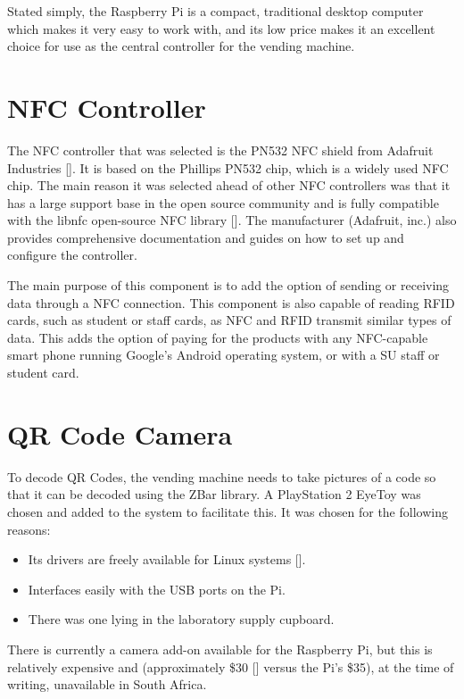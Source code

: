 Stated simply, the Raspberry Pi is a compact, traditional desktop computer which makes it very
easy to work with, and its low price makes it an excellent choice for use as the central
controller for the vending machine.

\section{NFC Controller}
\label{sec:nfc-controller}

The NFC controller that was selected is the PN532 NFC shield from Adafruit Industries
[\cite{website:adafruit-nfc}]. It is based on
the Phillips PN532 chip, which is a widely used NFC chip. The main reason it was selected ahead
of other NFC controllers was that it has a large support base in the open source
community and is fully compatible with the libnfc open-source NFC library
[\cite{website:libnfc-hardware}]. The manufacturer (Adafruit, inc.) also provides comprehensive
documentation and guides on how to set up and configure the controller.
 
The main purpose of this component is to add the option of sending or receiving data through a NFC connection.
This component is also capable of reading RFID cards, such as student or staff cards, as NFC
and RFID transmit similar types of data. This adds the option of paying for the products with 
any NFC-capable smart phone running Google's Android operating system, or with a SU staff or
student card.

\section{QR Code Camera}
\label{sec:webcam}

To decode QR Codes, the vending machine needs to take pictures of a code so that it can be
decoded using the ZBar library. A PlayStation 2 EyeToy was chosen and added to the system to
facilitate this. It was chosen for the following reasons:

\begin{itemize}
  \item Its drivers are freely available for Linux systems [\cite{website:webcam-drivers}].
  \item Interfaces easily with the USB ports on the Pi.
  \item There was one lying in the laboratory supply cupboard.
\end{itemize}

There is currently a camera add-on available for the Raspberry Pi, but this is relatively
expensive and (approximately \$30 [\cite{website:raspi-camera}] versus the Pi's \$35), at the
time of writing, unavailable in South Africa.


